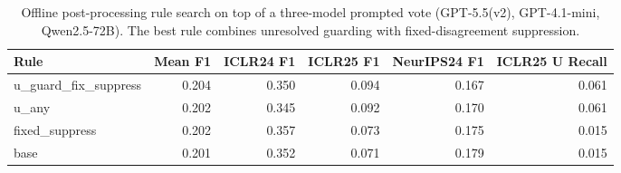 \begin{table}[t]
\centering
\scriptsize
\setlength{\tabcolsep}{3pt}
\begin{tabular}{p{}rrrrr}
\toprule
Rule & Mean F1 & ICLR24 F1 & ICLR25 F1 & NeurIPS24 F1 & ICLR25 U Recall \\
\midrule
u\_guard\_fix\_suppress & 0.204 & 0.350 & 0.094 & 0.167 & 0.061 \\
u\_any & 0.202 & 0.345 & 0.092 & 0.170 & 0.061 \\
fixed\_suppress & 0.202 & 0.357 & 0.073 & 0.175 & 0.015 \\
base & 0.201 & 0.352 & 0.071 & 0.179 & 0.015 \\
\bottomrule
\end{tabular}
\caption{Offline post-processing rule search on top of a three-model prompted vote (GPT-5.5(v2), GPT-4.1-mini, Qwen2.5-72B). The best rule combines unresolved guarding with fixed-disagreement suppression.}
\label{tab:prompted-llm-postprocess-rules}
\end{table}
